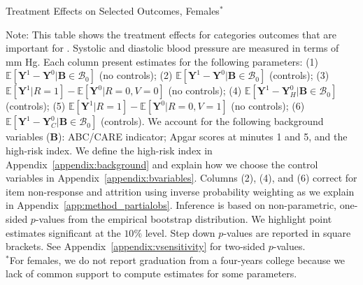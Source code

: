 \begin{table}
\centering
\begin{threeparttable}
\caption{Treatment Effects on Selected Outcomes, Females$^*$}\label{table:tescombinedfemales}
\begin{scriptsize}

\end{scriptsize}
\begin{tablenotes}
\scriptsize
Note: This table shows the treatment effects for categories outcomes that are important for \citet{Garcia_Heckman_Leaf_etal_2017_Comp_CBA_Unpublished}. Systolic and diastolic blood pressure are measured in terms of mm Hg. Each column present estimates for the following parameters: (1) $\mathbb{E} \left [ \bm{Y}^1 -  \bm{Y}^0 | \bm{B} \in \mathcal{B}_{0} \right]$ (no controls); (2) $\mathbb{E} \left [ \bm{Y}^1 -  \bm{Y}^0 | \bm{B} \in \mathcal{B}_{0} \right]$ (controls); (3) $\mathbb{E} \left [ \bm{Y}^1 | R = 1 \right] -  \mathbb{E} \left [ \bm{Y}^0 | R = 0,V = 0  \right]$ (no controls); (4) $\mathbb{E} \left [ \bm{Y}^1 -  \bm{Y}_H^0 | \bm{B} \in \mathcal{B}_{0} \right]$ (controls); (5) $\mathbb{E} \left [ \bm{Y}^1 | R = 1 \right] -  \mathbb{E} \left [ \bm{Y}^0 | R = 0,V = 1 \right]$ (no controls); (6) $\mathbb{E} \left [ \bm{Y}^1 -  \bm{Y}_C^0 | \bm{B} \in \mathcal{B}_{0} \right]$ (controls). We account for the following background variables ($\bm{B}$): ABC/CARE indicator; Apgar scores at minutes 1 and 5, and the high-risk index. We define the high-risk index in Appendix~\ref{appendix:background} and explain how we choose the control variables in Appendix~\ref{appendix:bvariables}. Columns (2), (4), and (6) correct for item non-response and attrition using inverse probability weighting as we explain in Appendix~\ref{app:method_partialobs}. Inference is based on non-parametric, one-sided $p$-values from the empirical bootstrap distribution. We highlight point estimates significant at the $10\%$ level. Step down $p$-values are reported in square brackets. See Appendix~\ref{appendix:vsensitivity} for two-sided $p$-values.\\
$^*$For females, we do not report graduation from a four-years college because we lack of common support to compute estimates for some parameters.
\end{tablenotes}
\end{threeparttable}
\end{table}
\doublespacing

